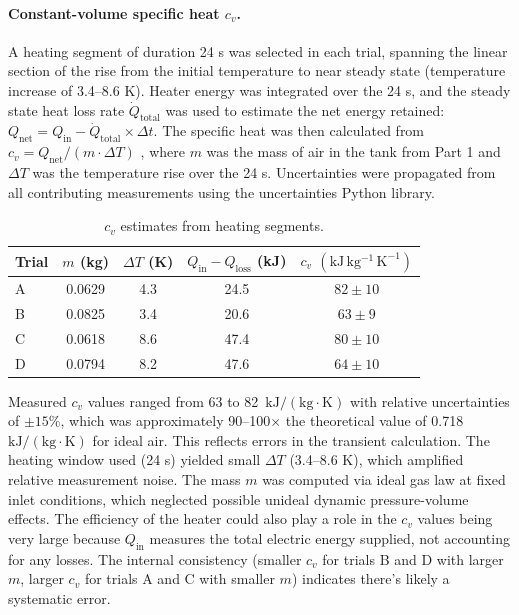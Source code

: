 \documentclass[12pt]{article}
\begin{document}
\paragraph{Constant-volume specific heat $c_v$.} A heating segment of duration 24 s was selected in each trial, spanning the linear section of the rise from the initial temperature to near steady state (temperature increase of 3.4–8.6 K). 
Heater energy was integrated over the 24 s, and the steady state heat loss rate $\dot{Q}_{\text{total}}$ was used to estimate the net energy retained: $Q_{\text{net}} = Q_{\text{in}} - \dot{Q}_{\text{total}} \times \Delta t$. 
The specific heat was then calculated from $c_v = Q_{\text{net}} / (m \cdot \Delta T)$ \cite{che260_manual}, where $m$ was the mass of air in the tank from Part 1 and $\Delta T$ was the temperature rise over the 24 s. Uncertainties were propagated from all contributing measurements using the uncertainties Python library.


\begin{table}[H]\centering
\begin{tabular}{@{}lcccc@{}}
\toprule
Trial & $m$ (kg) & $\Delta T$ (K) & $Q_{\text{in}}-Q_{\text{loss}}$ (kJ) & $c_v$ $(\mathrm{kJ\,kg^{-1}\,K^{-1}})$ \\
\midrule
A & 0.0629 & 4.3 & 24.5 & $82 \pm 10$ \\
B & 0.0825 & 3.4 & 20.6 & $63 \pm 9$ \\
C & 0.0618 & 8.6 & 47.4 & $80 \pm 10$ \\
D & 0.0794 & 8.2 & 47.6 & $64 \pm 10$ \\
\bottomrule
\end{tabular}
\caption{$c_v$ estimates from heating segments.}
\label{tab:cv}
\end{table}

Measured $c_v$ values ranged from 63 to 82~$\mathrm{kJ/(kg \cdot K)}$ with relative uncertainties of $\pm 15\%$, which was approximately 90--100$\times$ the theoretical value of 0.718~$\mathrm{kJ/(kg \cdot K)}$ for ideal air. 
This reflects errors in the transient calculation. The heating window used (24 s) yielded small $\Delta T$ (3.4--8.6 K), which amplified relative measurement noise. The mass $m$ was computed via ideal gas law at fixed inlet conditions, which neglected possible unideal dynamic pressure-volume effects. The efficiency of the heater could also play a role in the $c_v$ values being very large because $Q_{\text{in}}$ measures the total electric energy supplied, not accounting for any losses. 
The internal consistency (smaller $c_v$ for trials B and D with larger $m$, larger $c_v$ for trials A and C with smaller $m$) indicates there's likely a systematic error. 
\end{document}
